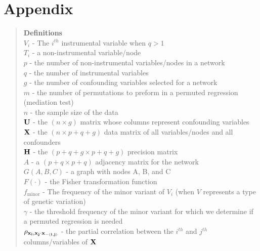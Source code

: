 \documentclass[12pt]{report}
\begin{document}
\section*{Appendix}
\begin{quote}
\textbf{Definitions}\\
$V_i$ - The $i^{th}$ instrumental variable when $q > 1$\\
$T_i$ - a non-instrumental variable/node\\
$p$ - the number of non-instrumental variables/nodes in a network\\
$q$ - the number of instrumental variables\\
$g$ - the number of confounding variables selected for a network\\
$m$ - the number of permutations to preform in a permuted regression (mediation test)\\
$n$ - the sample size of the data\\
$\bf U$ - the $(n \times g)$ matrix whose columns represent confounding variables\\
$\bf X$ - the $(n \times p+q+g)$ data matrix of all variables/nodes and all confounders\\
$\bf H$ - the $(p+q+g \times p+q+g)$ precision matrix \\
$A$ - a $(p+q \times p+q)$ adjacency matrix for the network  \\
$G(A,B,C)$ - a graph with nodes A, B, and C\\
$F(\cdot)$ - the Fisher transformation function\\
$f_{\text{minor}}$ - The frequency of the minor variant of $V_i$ (when $V$ represents a type of genetic variation)\\
$\gamma$ - the threshold frequency of the minor variant for which we determine if a permuted regression is needed\\
$\rho_{\bf x_i,x_j\cdot x_{ -(i,j)}  }$ - the partial correlation between the $i^{th}$ and $j^{th}$ columns/variables of ${\bf X}$
\end{quote}
\end{document}
